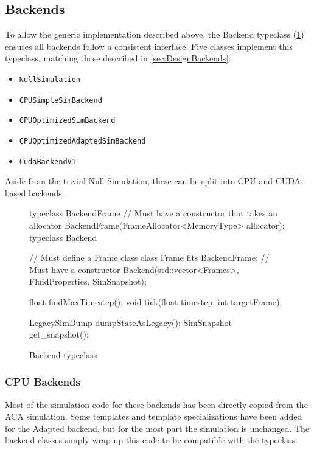 \subsection{Backends}
To allow the generic implementation described above, the Backend typeclass (\cref{fig:TypeclassBackend}) ensures all backends follow a consistent interface.
Five classes implement this typeclass, matching those described in \cref{sec:DesignBackends}:
\begin{itemize}
    \item \texttt{NullSimulation}
    \item \texttt{CPUSimpleSimBackend}
    \item \texttt{CPUOptimizedSimBackend}
    \item \texttt{CPUOptimizedAdaptedSimBackend}
    \item \texttt{CudaBackendV1}
\end{itemize}
Aside from the trivial Null Simulation, these can be split into CPU and CUDA-based backends.

\begin{figure}
    \centering
\begin{cppcode}
typeclass BackendFrame {
    // Must have a constructor that takes an allocator
    BackendFrame(FrameAllocator<MemoryType> allocator);
}
typeclass Backend {
    // Must define a Frame class
    class Frame fits BackendFrame;
    // Must have a constructor
    Backend(std::vector<Frames>, FluidProperties, SimSnapshot);
    
    float findMaxTimestep();
    void tick(float timestep, int targetFrame);
    
    LegacySimDump dumpStateAsLegacy();
    SimSnapshot get_snapshot();
}    
\end{cppcode}
    \caption{Backend typeclass}
    \label{fig:TypeclassBackend}
\end{figure}

\subsubsection{CPU Backends}
Most of the simulation code for these backends has been directly copied from the ACA simulation\cite{modules:aca257submission}.
Some templates and template specializations have been added for the Adapted backend, but for the most part the simulation is unchanged.
The backend classes simply wrap up this code to be compatible with the typeclass.

